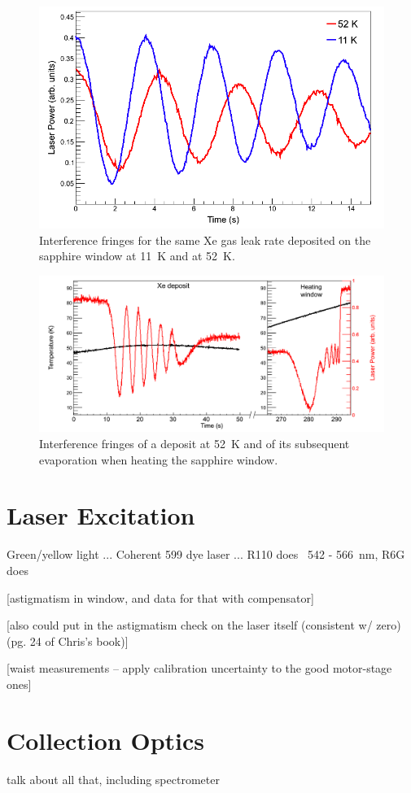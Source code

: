 \begin{figure} %
        \centering
                \includegraphics[width=.7\textwidth]{figures/fringes_52K_vs_11K.png}
                \caption{Interference fringes for the same Xe gas leak rate deposited on the sapphire window at 11~K and at 52~K.}
\label{fig:fringes_52K_vs_11K}
\end{figure}

\begin{figure} %
        \centering
                \includegraphics[width=.9\textwidth]{figures/fringes_dep_and_melt.png}
                \caption{Interference fringes of a deposit at 52~K and of its subsequent evaporation when heating the sapphire window.}
\label{fig:fringes_melt_withDep}
\end{figure}

\section{Laser Excitation}

Green/yellow light ... Coherent 599 dye laser ... R110 does ~542 - 566~nm, R6G does

[astigmatism in window, and data for that with compensator]

[also could put in the astigmatism check on the laser itself (consistent w/ zero) (pg. 24 of Chris's book)]

[waist measurements -- apply calibration uncertainty to the good motor-stage ones]

\section{Collection Optics}

talk about all that, including spectrometer